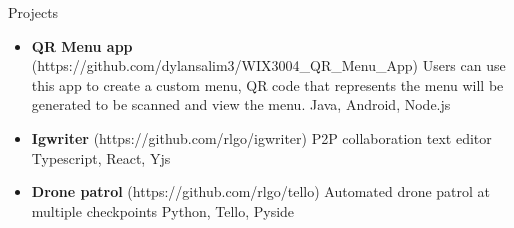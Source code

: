 \documentclass[]{mcdowellcv}
\begin{document}
\begin{cvsection}{Projects}
	\begin{cvsubsection}{}{}{}
		\begin{itemize}
			\setlength\itemsep{3pt}
			\item \textbf{QR Menu app} (https://github.com/dylansalim3/WIX3004\_QR\_Menu\_App)  Users can use this app to create a custom menu, QR code that represents the menu will be generated to be scanned and view the menu. Java, Android, Node.js
			\item \textbf{Igwriter} (https://github.com/rlgo/igwriter)  P2P collaboration text editor Typescript, React, Yjs
			\item \textbf{Drone patrol} (https://github.com/rlgo/tello)  Automated drone patrol at multiple checkpoints Python, Tello, Pyside
		\end{itemize}
	\end{cvsubsection}
\end{cvsection}

\
\end{document}
